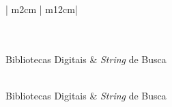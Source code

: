  \begin{longtable}[!tb]{ | m{2cm} | m{12cm}| }
 \caption{Bibliotecas digitais e \textit{String} de busca adaptadas.\label{long}}\\
 
 \hline
 \\
 \hline
 Bibliotecas Digitais & \textit{String} de Busca\\
 \hline
 \endfirsthead
 
 \hline
 \\
 \hline
 Bibliotecas Digitais & \textit{String} de Busca\\
 \hline
 \endhead
 
 \hline
 \endfoot
 
 \hline
 \\
 \hline\hline
 \endlastfoot
 

\end{longtable}
